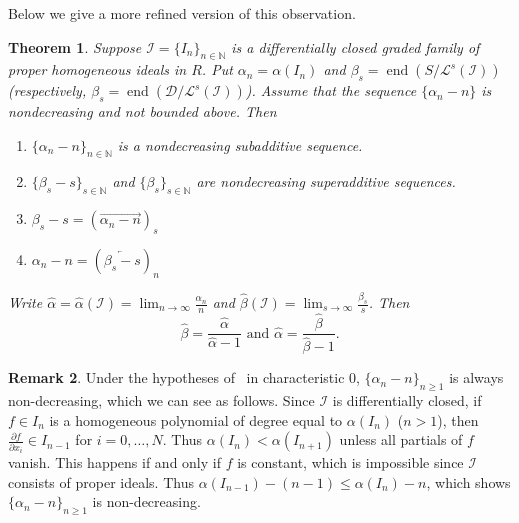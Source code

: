 \documentclass[12pt, reqno]{amsart}
\numberwithin{equation}{section}
\def\a{\ensuremath{\alpha}}
\def\b{\ensuremath{\beta}}
\newcommand{\wa}{\widehat{\alpha}}
\newcommand{\wb}{\widehat{\beta}}
\newcommand{\N}{{\mathbb N}}
\newcommand{\I}{{\mathcal I}}
\renewcommand{\L}{{\mathcal L}}
\DeclareMathOperator{\soc}{end}
\theoremstyle{plain} %
\newtheorem{thm}{Theorem}[section]
\theoremstyle{definition}
\newtheorem{rem}[thm]{Remark}
\theoremstyle{remark}
\renewcommand{\L}{\mathcal{L}}
\begin{document}
Below we give a more refined version of this observation.

\begin{thm}\label{thm:InverseSystemDualityGeneral}
Suppose $\I=\{I_n\}_{n\in\N}$ is a differentially closed graded family of proper homogeneous ideals in $R$.  Put $\alpha_n = \alpha(I_n)$ and $\beta_s=\soc(S/\L^s(\I))$ (respectively, $\beta_s=\soc(\mathcal{D}/\L^s(\I))$).  Assume that the sequence $\{\alpha_n-n\}$ is nondecreasing and not bounded above.  Then
\begin{enumerate}
\item\label{c:1} $\{\a_n-n\}_{n\in \N}$ is a nondecreasing subadditive sequence.
\item\label{c:2} $\{\b_s-s\}_{s\in \N}$ and $\{\b_s\}_{s\in \N}$ are nondecreasing superadditive sequences.
\item\label{c:3} $\b_s-s=(\overrightarrow{\a_n-n})_s$
\item\label{c:4} $\a_n-n=(\overleftarrow{\b_s-s})_n$
\end{enumerate}
Write $\wa=\wa(\I)=\lim_{n\to\infty}\frac{\alpha_n}{n}$ and $\wb(\I)=\lim_{s\to\infty} \frac{\beta_s}{s}$.  Then
\[
\wb=\frac{\wa}{\wa-1} \mbox{  and  } \wa=\frac{\wb}{\wb-1}.
\]
\end{thm}
\begin{rem}\label{rem:char0}
Under the hypotheses of~ in characteristic $0$, $\{\alpha_n-n\}_{n\ge 1}$ is always non-decreasing, which we can see as follows.  Since $\I$ is differentially closed, if $f\in I_n$ is a homogeneous polynomial of degree equal to $\alpha(I_n)$ ($n>1$), then $\frac{\partial f}{\partial x_i}\in I_{n-1}$ for $i=0,\ldots,N$.  Thus $\alpha(I_n)<\alpha(I_{n+1})$ unless all partials of $f$ vanish.  This happens if and only if $f$ is constant, which is impossible since $\I$ consists of proper ideals.  Thus $\alpha(I_{n-1})-(n-1)\le \alpha(I_{n})-n$, which shows $\{\alpha_n-n\}_{n\ge 1}$ is non-decreasing.
\end{rem}
\end{document}
